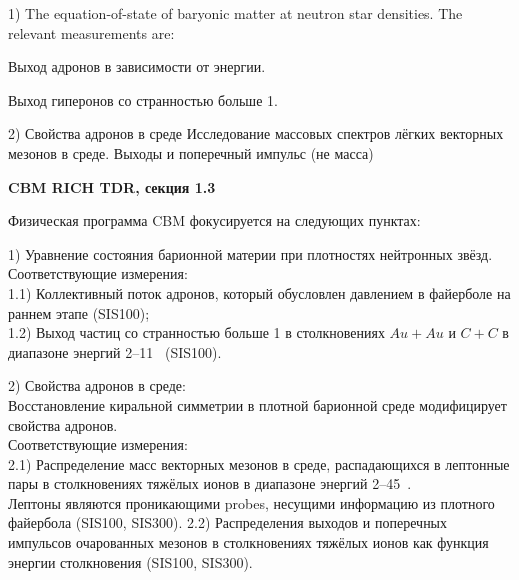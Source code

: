 1) The equation-of-state of baryonic matter at neutron star densities.
The relevant measurements are:

Выход адронов в зависимости от энергии.

Выход гиперонов со странностью больше 1.

2) Свойства адронов в среде
Исследование массовых спектров лёгких векторных мезонов в среде.
Выходы и поперечный импульс (не масса) 




\textbf{CBM RICH TDR, секция 1.3}

Физическая программа CBM фокусируется на следующих пунктах:

1) Уравнение состояния барионной материи при плотностях нейтронных звёзд. \\
Соответствующие измерения: \\
1.1) Коллективный поток адронов, который обусловлен давлением в файерболе на раннем этапе (SIS100); \\
1.2) Выход частиц со странностью больше 1 в столкновениях $Au+Au$ и $C+C$ в диапазоне энергий 2--11~\GeVperNucl{} (SIS100).

2) Свойства адронов в среде: \\
Восстановление киральной симметрии в плотной барионной среде модифицирует свойства адронов. \\
Соответствующие измерения: \\
2.1) Распределение масс векторных мезонов в среде, распадающихся в лептонные пары в столкновениях тяжёлых ионов в диапазоне энергий 2--45~\GeVperNucl{}. \\
Лептоны являются проникающими \todo probes, несущими информацию из плотного файербола (SIS100, SIS300).
2.2) Распределения выходов и поперечных импульсов очарованных мезонов в столкновениях тяжёлых ионов как функция энергии столкновения (SIS100, SIS300).

